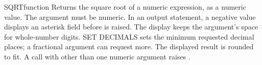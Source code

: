\begin{XbaseEntry}{SQRT}{function}
Returns the square root of a numeric expression, as a numeric value.
\Syntax
{}
\Usage
The argument must be numeric. In an output statement, a negative value
displays an asterisk field before  is raised.
The display keeps the argument's space for whole-number digits.
SET DECIMALS sets the minimum requested decimal places; a fractional
argument can request more. The displayed result is rounded to fit.
A call with other than one numeric argument raises
.
\Examples
{}
\end{XbaseEntry}

